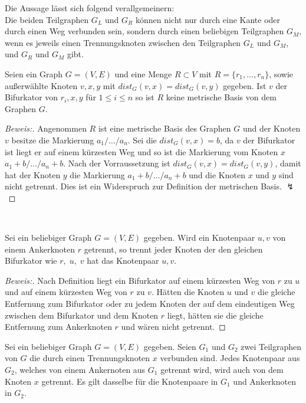   \begin{bem}
  \label{aussagetrennungsgraphen}
  Die Aussage lässt sich folgend verallgemeinern:\\
  Die beiden Teilgraphen $G_L$ und $G_R$ können nicht nur durch eine Kante oder durch einen Weg verbunden sein, sondern durch einen beliebigen Teilgraphen $G_M$, wenn es jeweils einen Trennungsknoten zwischen den Teilgraphen $G_L$ und $G_M$, und $G_R$ und $G_M$ gibt.
  \end{bem}
\begin{lem}
\label{Bifurnachbar}
Seien ein Graph $G=(V,E)$ und eine Menge $R \subset V$ mit $R=\{r_1, \ldots , r_n\}$, sowie außerwählte Knoten $v,x,y$ mit $dist_G(v,x)=dist_G(v,y)$ gegeben. Ist $v$ der Bifurkator von $r_i,x,y$ für $1 \leq i \leq n$ so ist $R$ keine metrische Basis von dem Graphen $G$.
\end{lem}
\begin{proof}[Beweis:]
Angenommen $R$ ist eine metrische Basis des Graphen $G$ und der Knoten $v$ besitze die Markierung $a_1/\ldots /a_n$. Sei die $dist_G(v,x)=b$, da $v$ der Bifurkator ist liegt er auf einem kürzesten Weg und so ist die Markierung vom Knoten $x$ $a_1+b/\ldots /a_n+b$. Nach der Vorraussetzung ist $dist_G(v,x)=dist_G(v,y)$, damit hat der Knoten $y$ die Markierung $a_1+b/\ldots /a_n+b$ und die Knoten $x$ und $y$ sind nicht getrennt. Dies ist ein Widerspruch zur Definition der metrischen Basis. $\lightning$
\end{proof}
~ \linebreak
\vspace{-12mm}
\begin{lem}
\label{bifur}
Sei ein beliebiger Graph $G=(V,E)$ gegeben. Wird ein Knotenpaar $u,v$ von einem Ankerknoten $r$ getrennt, so trennt jeder Knoten der den gleichen Bifurkator wie $r,\;u,\;v$ hat das Knotenpaar $u,v$.
\end{lem}
\begin{proof}[Beweis:]
Nach Definition liegt ein Bifurkator auf einem kürzesten Weg von $r$ zu $u$ und auf einem kürzesten Weg von $r$ zu $v$. Hätten die Knoten $u$ und $v$ die gleiche Entfernung zum Bifurkator oder zu jedem Knoten der auf dem eindeutigen Weg zwischen dem Bifurkator und dem Knoten $r$ liegt, hätten sie die gleiche Entfernung zum Ankerknoten $r$ und wären nicht getrennt.
\end{proof}
\begin{lem}
\label{trennungsknoten}
Sei ein beliebiger Graph $G=(V,E)$ gegeben. Seien $G_1$ und $G_2$ zwei Teilgraphen von $G$ die durch einen Trennungsknoten $x$ verbunden sind. Jedes Knotenpaar aus $G_2$, welches von einem Ankernoten aus $G_1$ getrennt wird, wird auch von dem Knoten $x$ getrennt. Es gilt dasselbe für die Knotenpaare in $G_1$ und Ankerknoten in $G_2$.
\end{lem}
